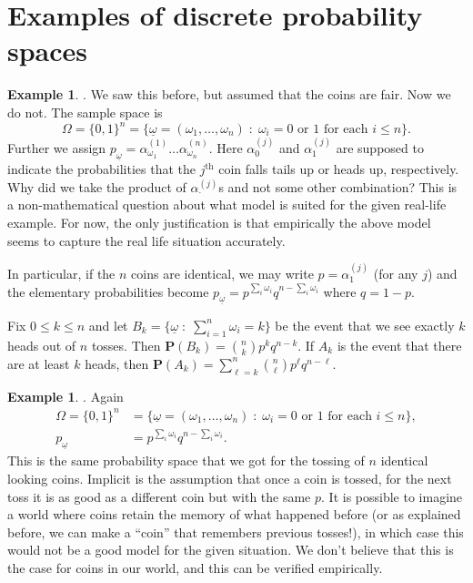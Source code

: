 \documentclass[preprint,  11pt]{amsart}
\newcommand{\parag}[1]{\vspace{4mm}\noindent{\bfseries #1}}
\def\ome{\omega}
\theoremstyle{plain} %
\theoremstyle{definition} %
\newtheorem{example}[theorem]{Example}
\begin{document}
\section{Examples of discrete probability spaces}
\begin{example} \parag{Toss $n$ coins}. We saw this before, but assumed that the coins are fair. Now we do not. The sample space is
$$
\Omega=\{0,1\}^{n}=\{\underline{\ome}=(\omega_{1},\ldots ,\omega_{n}){\; : \;} \omega_{i}=0 \mbox{ or } 1 \mbox{ for each }i\le n\}.
$$
Further we assign $p_{\underline{\ome}}=\alpha_{\omega_{1}}^{(1)}\ldots \alpha_{\omega_{n}}^{(n)}$. Here $\alpha_{0}^{(j)}$ and $\alpha_{1}^{(j)}$ are supposed to indicate the probabilities that the $j^{\mbox{th}}$ coin falls tails up or heads up, respectively. Why did we take the product of $\alpha^{(j)}_{\cdot}$s and not some other combination? This is a non-mathematical question about what model is suited for the given real-life example. For now, the only justification is that empirically the above model seems to capture the real life situation accurately.

In particular, if the $n$ coins are identical, we may write $p=\alpha_{1}^{(j)}$ (for any $j$) and the elementary probabilities become  $p_{\underline{\ome}}=p^{\sum_{i}\omega_{i}}q^{n-\sum_{i}\omega_{i}}$ where $q=1-p$. 

Fix $0\le k\le n$ and let $B_{k}=\{\underline{\ome}{\; : \;} \sum_{i=1}^{n}\omega_{i}=k\}$ be the event that we see exactly $k$ heads out of $n$ tosses. Then $\mathbf{P}(B_{k})=\binom{n}{k}p^{k}q^{n-k}$. If $A_{k}$ is the event that there are at least $k$ heads, then
$\mathbf{P}(A_{k})=\sum\limits_{\ell=k}^{n}\binom{n}{\ell}p^{\ell}q^{n-\ell}$.
\end{example}

\begin{example} \parag{Toss a coin $n$ times}. Again 
\begin{align*}
\Omega=\{0,1\}^{n}&=\{\underline{\ome}=(\omega_{1},\ldots ,\omega_{n}){\; : \;} \omega_{i}=0 \mbox{ or } 1 \mbox{ for each }i\le n\}, \\
p_{\underline{\ome}}&=p^{\sum_{i}\omega_{i}}q^{n-\sum_{i}\omega_{i}}.
\end{align*}
This is the same probability space that we got for the tossing of $n$ identical looking coins. Implicit is the assumption that once a coin is tossed, for the next toss it is as good as a different coin but with the same $p$. It is possible to imagine a world where coins retain the memory of what happened before (or as explained before, we can make a ``coin'' that remembers previous tosses!), in which case this would not be a good model for the given situation. We don't believe that this is the case for coins in our world, and this can be verified empirically.
\end{example}
\end{document}
